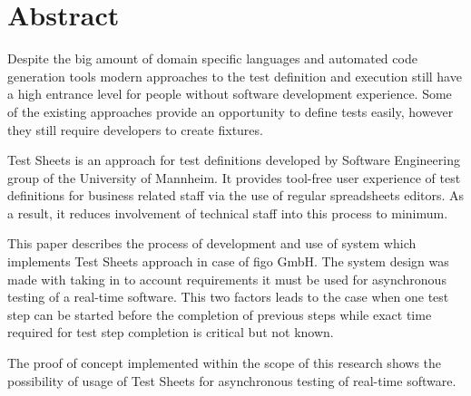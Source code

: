 \chapter{Abstract}
\label{chap:abstract}
Despite the big amount of domain specific languages and automated code generation tools modern approaches to the test definition and execution still have a high entrance level for people without software development experience. Some of the existing approaches provide an opportunity to define tests easily, however they still require developers to create fixtures. 

Test Sheets is an approach for test definitions developed by Software Engineering group of the University of Mannheim. It provides  tool-free user experience of test definitions for business related staff via the use of regular spreadsheets editors.
As a result, it reduces involvement of technical staff into this process to minimum.

This paper describes the process of development and use of system which implements Test Sheets approach in case of figo GmbH. The system design was made with taking in to account requirements it must be used for asynchronous testing of a real-time software. This two factors leads to the case when one test step can be started before the completion of previous steps while exact time required for test step completion is critical but not known.

The proof of concept implemented within the scope of this research shows the possibility of usage of Test Sheets for asynchronous testing of real-time software.

